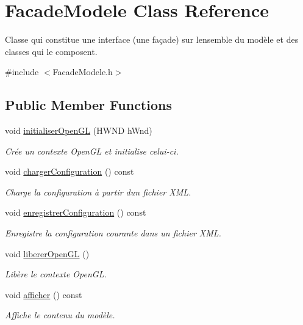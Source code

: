 \hypertarget{class_facade_modele}{}\section{Facade\+Modele Class Reference}
\label{class_facade_modele}


Classe qui constitue une interface (une façade) sur l\textquotesingle{}ensemble du modèle et des classes qui le composent.  




{\ttfamily \#include $<$Facade\+Modele.\+h$>$}

\subsection*{Public Member Functions}
\begin{DoxyCompactItemize}
\item 
void \hyperlink{group__inf2990_gabf12ccafbabf1049cb8327cf78699a1b}{initialiser\+Open\+G\+L} (H\+W\+N\+D h\+Wnd)
\begin{DoxyCompactList}\small\item\em Crée un contexte Open\+G\+L et initialise celui-\/ci. \end{DoxyCompactList}\item 
void \hyperlink{group__inf2990_ga4967547e0683bfdca700118df1c18bca}{charger\+Configuration} () const 
\begin{DoxyCompactList}\small\item\em Charge la configuration à partir d\textquotesingle{}un fichier X\+M\+L. \end{DoxyCompactList}\item 
void \hyperlink{group__inf2990_ga277d8d9cea21e20fb366a0d48525f2c9}{enregistrer\+Configuration} () const 
\begin{DoxyCompactList}\small\item\em Enregistre la configuration courante dans un fichier X\+M\+L. \end{DoxyCompactList}\item 
void \hyperlink{group__inf2990_gac7b831ce13626514e9637c4533d7c15d}{liberer\+Open\+G\+L} ()
\begin{DoxyCompactList}\small\item\em Libère le contexte Open\+G\+L. \end{DoxyCompactList}\item 
void \hyperlink{group__inf2990_gac884e818dab5fe049a37b3f6f1c5d8c6}{afficher} () const 
\begin{DoxyCompactList}\small\item\em Affiche le contenu du modèle. \end{DoxyCompactList}\item 

\end{DoxyCompactItemize}
